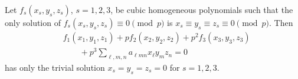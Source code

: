 \begin{proposition}\label{eq:047}
    Let $f_s(x_s,y_s,z_s)$, $s=1,2,3$, be cubic homogeneous polynomials such that the only solution of $f_s(x_s,y_s,z_s)\equiv0\pmod p$ is $x_s\equiv y_s\equiv z_s\equiv0\pmod p$. Then
\[
    \begin{aligned}&f_1(x_1,y_1,z_1)+pf_2(x_2,y_2,z_2)+p^2f_3(x_3,y_3,z_3)\\&\qquad{}+p^3\sum_{\ell,m,n}a_{\ell mn}x_\ell y_mz_n=0\end{aligned}
\]
    has only the trivial solution $x_s=y_s=z_s=0$ for $s=1,2,3$.
\end{proposition}
